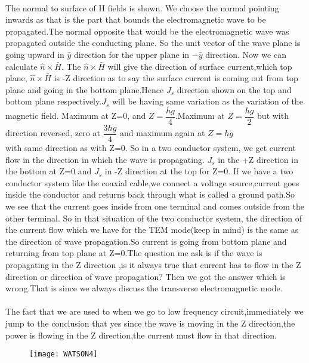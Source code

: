 	\paragraph{}The normal to surface of H fields is shown. We choose the normal pointing inwards as that is the part that bounds the electromagnetic wave to be propagated.The normal opposite that would be the electromagnetic wave was propagated outside the conducting plane. So the unit vector of the wave plane is going upward in ${\hat{y}}$ direction for the upper plane in ${-\hat{y}}$ direction. Now we can calculate ${\hat{n}\times\bar{H}}$. The ${\hat{n}\times\bar{H}}$ will give the direction of surface current,which top plane, ${\hat{n}\times\bar{H}}$ is -Z direction as to say the surface current is coming out from top plane and going in the bottom plane.Hence ${J_s}$ direction shown on the top and bottom plane respectively.${J_s}$ will be having same variation as the variation of the magnetic field. Maximum at Z=0, and ${Z= \dfrac{hg}{4}}$.Maximum at ${Z=\dfrac{hg}{2}}$ but with direction reversed, zero at ${\dfrac{3hg}{4}}$ and maximum again at ${Z=hg}$\\
	
	with same direction as with Z=0. So in a two conductor system, we get current flow in the direction in which the wave is propagating. ${J_s}$ in the +Z direction in the bottom at Z=0 and ${J_s}$ in -Z direction at the top for Z=0. If we have a two conductor system like the coaxial cable,we connect a voltage source,current goes inside the conductor and returns back through what is called a ground path.So we see that the current goes inside from one terminal and comes outside from the other terminal. So in that situation of the two conductor system, the direction of the current flow which we have for the TEM mode(keep in mind) is the same as the direction of wave propagation.So current is going from bottom plane and returning from top plane at Z=0.The question me ask is if the wave is propagating in the Z direction ,is it always true that current has to flow in the Z direction or direction of wave propagation? Then we got the answer which is wrong.That is since we always discuss the transverse electromagnetic mode.
	\paragraph{}The fact that we are used to when we go to low frequency circuit,immediately we jump to the conclusion that yes since the wave is moving in the Z direction,the power is flowing in the Z direction,the current must flow in that direction.\\
\begin{figure}[h]
			\centering
			\texttt{[image: WATSON4]}
			\caption{}
		\end{figure}
